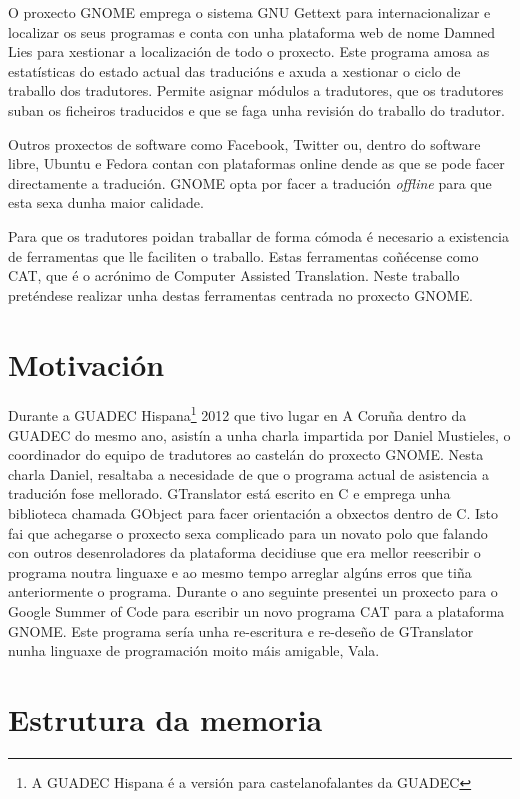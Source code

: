 O proxecto GNOME emprega o sistema GNU Gettext para internacionalizar e localizar os seus programas e conta con unha plataforma web de nome Damned Lies para xestionar a localización de todo o proxecto. Este programa amosa as estatísticas do estado actual das traducións e axuda a xestionar o ciclo de traballo dos tradutores. Permite asignar módulos a tradutores, que os tradutores suban os ficheiros traducidos e que se faga unha revisión do traballo do tradutor.

Outros proxectos de software como Facebook, Twitter ou, dentro do software libre, Ubuntu e Fedora contan con plataformas online dende as que se pode facer directamente a tradución. GNOME opta por facer a tradución \emph{offline} para que esta sexa dunha maior calidade.

Para que os tradutores poidan traballar de forma cómoda é necesario a existencia de ferramentas que lle faciliten o traballo. Estas ferramentas coñécense como CAT, que é o acrónimo de Computer Assisted Translation. Neste traballo preténdese realizar unha destas ferramentas centrada no proxecto GNOME.

\section{Motivación}
Durante a GUADEC Hispana\footnote{A GUADEC Hispana é a versión para castelanofalantes da GUADEC} 2012 que tivo lugar en A Coruña dentro da GUADEC do mesmo ano, asistín a unha charla impartida por Daniel Mustieles, o coordinador do equipo de tradutores ao castelán do proxecto GNOME. Nesta charla Daniel, resaltaba a necesidade de que o programa actual de asistencia a tradución fose mellorado. GTranslator está escrito en C e emprega unha biblioteca chamada GObject para facer orientación a obxectos dentro de C. Isto fai que achegarse o proxecto sexa complicado para un novato polo que falando con outros desenroladores da plataforma decidiuse que era mellor reescribir o programa noutra linguaxe e ao mesmo tempo arreglar algúns erros que tiña anteriormente o programa. Durante o ano seguinte presentei un proxecto para o Google Summer of Code para escribir un novo programa CAT para a plataforma GNOME. Este programa sería unha re-escritura e re-deseño de GTranslator nunha linguaxe de programación moito máis amigable, Vala.

\section{Estrutura da memoria}

